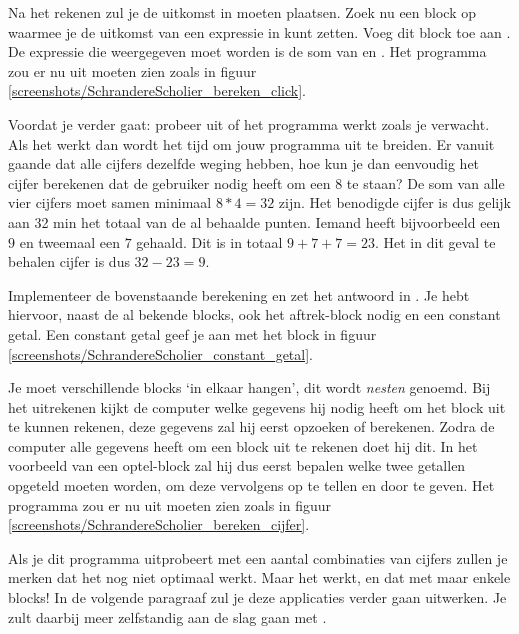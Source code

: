 \begin{opgave}
    \opgVraag
Na het rekenen zul je de uitkomst in  moeten plaatsen. Zoek nu een block op waarmee je de uitkomst van een expressie in  kunt zetten. Voeg dit block toe aan . De expressie die weergegeven moet worden is de som van  en . 
    \opgUitwerking
    Het programma zou er nu uit moeten zien zoals in figuur \ref{screenshots/SchrandereScholier_bereken_click}.
\end{opgave}

\runOpTelefoon{} Voordat je verder gaat: probeer uit of het programma werkt zoals je verwacht. Als het werkt dan wordt het tijd om jouw programma uit te breiden. Er vanuit gaande dat alle cijfers dezelfde weging hebben, hoe kun je dan eenvoudig het cijfer berekenen dat de gebruiker nodig heeft om een 8 te staan? De som van alle vier cijfers moet samen minimaal $8*4=32$ zijn. Het benodigde cijfer is dus gelijk aan 32 min het totaal van de al behaalde punten. Iemand heeft bijvoorbeeld een $9$ en tweemaal een $7$ gehaald. Dit is in totaal $9+7+7=23$. Het in dit geval te behalen cijfer is dus $32-23=9$.
 
 \begin{opgave}
    \opgVraag
Implementeer de bovenstaande berekening en zet het antwoord in . Je hebt hiervoor, naast de al bekende blocks, ook het aftrek-block nodig en een constant getal. Een constant getal geef je aan met het block in figuur  \ref{screenshots/SchrandereScholier_constant_getal}. 

Je moet verschillende blocks `in elkaar hangen', dit wordt \emph{nesten} genoemd. Bij het uitrekenen kijkt de computer welke gegevens hij nodig heeft om het block uit te kunnen rekenen, deze gegevens zal hij eerst opzoeken of berekenen. Zodra de computer alle gegevens heeft om een block uit te rekenen doet hij dit. In het voorbeeld van een optel-block zal hij dus eerst bepalen welke twee getallen opgeteld moeten worden, om deze vervolgens op te tellen en door te geven.
    \opgUitwerking
    Het programma zou er nu uit moeten zien zoals in figuur \ref{screenshots/SchrandereScholier_bereken_cijfer}.
\end{opgave}

\runOpTelefoon{}
Als je dit programma uitprobeert met een aantal combinaties van cijfers zullen je merken dat het nog niet optimaal werkt. Maar het werkt, en dat met maar enkele blocks! In de volgende paragraaf zul je deze applicaties verder gaan uitwerken. Je zult daarbij meer zelfstandig aan de slag gaan met \ai.

